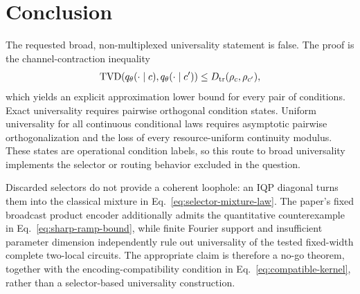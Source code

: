 \documentclass[11pt]{article}
\theoremstyle{definition}
\theoremstyle{remark}
\newcommand{\TVD}{\operatorname{TVD}}
\begin{document}
\section{Conclusion}
\label{sec:conclusion}

The requested broad, non-multiplexed universality statement is false.  The
proof is the channel-contraction inequality
\begin{equation*}
 \TVD(q_\theta(\cdot\mid c),q_\theta(\cdot\mid c'))
 \leq D_{\rm tr}(\rho_c,\rho_{c'}),
\end{equation*}
which yields an explicit approximation lower bound for every pair of
conditions.  Exact universality requires pairwise orthogonal condition
states.  Uniform universality for all continuous conditional laws requires
asymptotic pairwise orthogonalization and the loss of every resource-uniform
continuity modulus.  These states are operational condition labels, so this
route to broad universality implements the selector or routing behavior
excluded in the question.

Discarded selectors do not provide a coherent loophole: an IQP diagonal turns
them into the classical mixture in Eq.~\eqref{eq:selector-mixture-law}.  The
paper's fixed broadcast product encoder additionally admits the quantitative
counterexample in Eq.~\eqref{eq:sharp-ramp-bound}, while finite Fourier support
and insufficient parameter dimension independently rule out universality of
the tested fixed-width complete two-local circuits.  The appropriate claim is
therefore a no-go theorem, together with the encoding-compatibility condition
in Eq.~\eqref{eq:compatible-kernel}, rather than a selector-based universality
construction.



\end{document}
